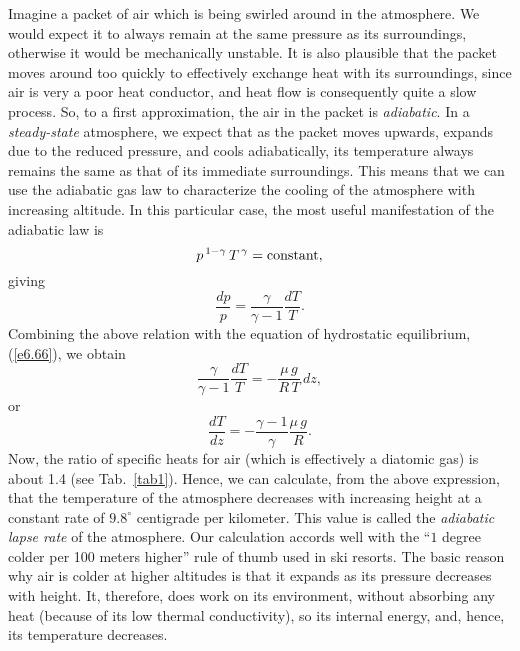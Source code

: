 Imagine a packet of air which is being swirled around in the atmosphere. We would
expect it to always remain at the same pressure as its surroundings, otherwise it
would be mechanically unstable. It is also plausible that the packet moves around
too quickly to effectively exchange heat with its surroundings, since
air is very a poor heat conductor, and heat flow is consequently quite a
slow process.  So,
to a first approximation, the air in the packet is {\em adiabatic}. 
In a {\em steady-state}\/ atmosphere, we expect that as the packet moves upwards,
expands due to the reduced pressure, and cools adiabatically, its temperature 
always remains the same as that of its immediate surroundings. 
This means that we
can use the adiabatic gas law to characterize the cooling of the
atmosphere with increasing altitude.  In this particular
case, the most useful manifestation of the adiabatic law is
\begin{equation}
p^{\,1-\gamma} \,T^{\,\gamma} = {\rm constant},
\end{equation}
giving
\begin{equation}
\frac{dp}{p} = \frac{\gamma}{\gamma -1} \frac{dT}{T}.
\end{equation}
Combining the above relation with the equation of hydrostatic equilibrium, 
(\ref{e6.66}), we obtain
\begin{equation}
\frac{\gamma}{\gamma-1}\frac{dT}{T} = -\frac{\mu \,g}{R\,T} \,dz,
\end{equation}
or
\begin{equation}
\frac{dT}{dz} = -\frac{\gamma -1}{\gamma} \frac{\mu\, g}{R}.\label{e6.73}
\end{equation}
Now,  the ratio of specific heats for air (which is effectively
a diatomic gas) is about 1.4 (see Tab.~\ref{tab1}). 
Hence, we can calculate, from the
 above expression, that  the temperature of the atmosphere decreases with 
increasing height
at a constant rate of  $9.8^\circ$ centigrade per kilometer. 
This value is called the {\em adiabatic lapse rate}\/ of the atmosphere.
Our calculation accords well with the
``$1$ degree colder per 100 meters higher'' rule of thumb used in ski resorts.
The basic reason why air is colder at higher altitudes is
that it expands as its pressure decreases with height. It, therefore, does work
on its environment, without absorbing any heat (because of its low thermal
conductivity), 
so its internal energy, and, hence, its temperature decreases. 

